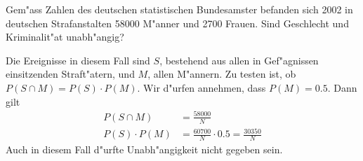 Gem"ass Zahlen des deutschen statistischen Bundesamster
befanden sich 2002 in deutschen Strafanstalten 58000 M"anner
und 2700 Frauen. Sind Geschlecht und Kriminalit"at unabh"angig?

\begin{loesung}
Die Ereignisse in diesem Fall sind $S$, bestehend aus allen in Gef"agnissen
einsitzenden Straft"atern, und $M$, allen M"annern. Zu testen ist, ob
$P(S\cap M)=P(S)\cdot P(M)$. Wir d"urfen annehmen, dass $P(M)=0.5$.
Dann gilt
\begin{align*}
P(S\cap M)&=\frac{58000}{N}\\
P(S)\cdot P(M)&=\frac{60700}{N}\cdot 0.5 = \frac{30350}{N}
\end{align*}
Auch in diesem Fall d"urfte Unabh"angigkeit nicht gegeben sein.
\end{loesung}

